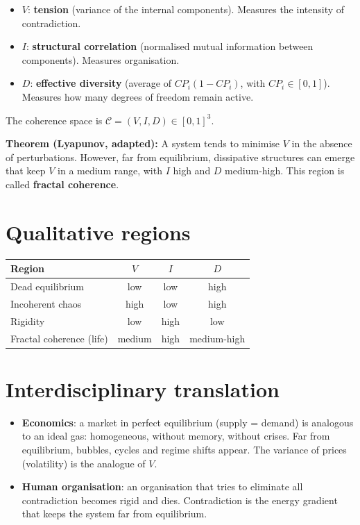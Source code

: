 \documentclass[12pt,oneside]{report}
\begin{document}
\begin{itemize}
\item \(V\): \textbf{tension} (variance of the internal components). Measures the intensity of contradiction.
\item \(I\): \textbf{structural correlation} (normalised mutual information between components). Measures organisation.
\item \(D\): \textbf{effective diversity} (average of \(CP_i(1-CP_i)\), with \(CP_i \in [0,1]\)). Measures how many degrees of freedom remain active.
\end{itemize}

The coherence space is \(\mathcal{C} = (V, I, D) \in [0,1]^3\).

\textbf{Theorem (Lyapunov, adapted):} A system tends to minimise \(V\) in the absence of perturbations. However, far from equilibrium, dissipative structures can emerge that keep \(V\) in a medium range, with \(I\) high and \(D\) medium‑high. This region is called \textbf{fractal coherence}.

\section{Qualitative regions}
\begin{tabular}{lccc}
\toprule
Region & \(V\) & \(I\) & \(D\) \\
\midrule
Dead equilibrium & low & low & high \\
Incoherent chaos & high & low & high \\
Rigidity & low & high & low \\
Fractal coherence (life) & medium & high & medium-high \\
\bottomrule
\end{tabular}

\section{Interdisciplinary translation}
\begin{itemize}
\item \textbf{Economics}: a market in perfect equilibrium (supply = demand) is analogous to an ideal gas: homogeneous, without memory, without crises. Far from equilibrium, bubbles, cycles and regime shifts appear. The variance of prices (volatility) is the analogue of \(V\).
\item \textbf{Human organisation}: an organisation that tries to eliminate all contradiction becomes rigid and dies. Contradiction is the energy gradient that keeps the system far from equilibrium.
\end{itemize}
\end{document}
